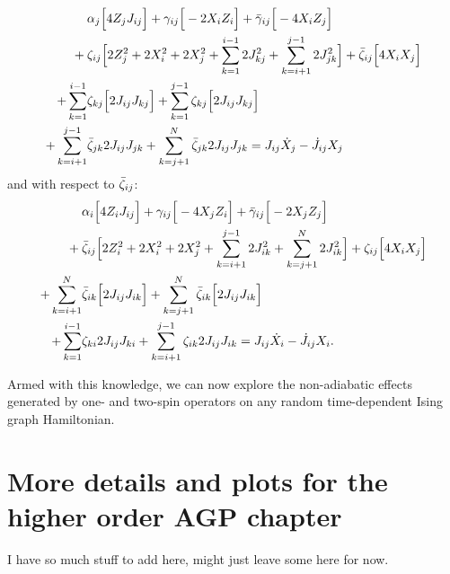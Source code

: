 \begin{equation}\label{eq:ising_graph_minimise_zeta}
    \begin{aligned}
        &\alpha_j\Big[ 4 Z_j J_{ij} \Big] + \gamma_{ij}\Big[ - 2 X_i Z_i\Big] + \Bar{\gamma}_{ij} \Big[ - 4 X_i Z_j \Big] \\
        + \: &\zeta_{ij} \Big[ 2 Z_j^2 + 2X_i^2 + 2X_j^2 + \sum_{k = 1}^{i-1} 2 J_{kj}^2 + \sum_{k = i+1}^{j-1} 2 J_{jk}^2 \Big] + \Bar{\zeta}_{ij}\Big[ 4 X_i X_j \Big] \\
        + \sum_{k = 1}^{i-1} &\zeta_{kj}\Big[ 2 J_{ij} J_{kj} \Big] + \sum_{k = 1}^{j-1} \zeta_{kj} \Big[2 J_{ij}J_{kj}\Big] \\
        + \sum_{k = i +1}^{j-1} &\Bar{\zeta}_{jk} 2 J_{ij} J_{jk} + \sum_{k = j +1}^N \Bar{\zeta}_{jk} 2 J_{ij} J_{jk} = J_{ij} \dot{X}_j - \dot{J}_{ij} X_j
    \end{aligned}
\end{equation}
and with respect to $\Bar{\zeta}_{ij}$:
\begin{equation}\label{eq:ising_graph_minimise_zetabar}
    \begin{aligned}
        &\alpha_i\Big[ 4 Z_i J_{ij} \Big] + \gamma_{ij}\Big[ - 4 X_j Z_i\Big] + \Bar{\gamma}_{ij} \Big[ - 2 X_j Z_j \Big] \\
        + \: &\Bar{\zeta}_{ij} \Big[ 2 Z_i^2 + 2X_i^2 + 2X_j^2 + \sum_{k = i+1}^{j-1} 2 J_{ik}^2 + \sum_{k = j+1}^N 2 J_{ik}^2 \Big] + \zeta_{ij}\Big[ 4 X_i X_j \Big] \\
        + \sum_{k = i+1}^N &\Bar{\zeta}_{ik}\Big[ 2 J_{ij} J_{ik} \Big] + \sum_{k = j+1}^N \Bar{\zeta}_{ik} \Big[2 J_{ij}J_{ik}\Big] \\
        + \sum_{k = 1}^{i-1} &\zeta_{ki} 2 J_{ij} J_{ki} + \sum_{k = i+1}^{j-1} \zeta_{ik} 2 J_{ij} J_{ik} = J_{ij} \dot{X}_i - \dot{J}_{ij} X_i.
    \end{aligned}
\end{equation}

Armed with this knowledge, we can now explore the non-adiabatic effects generated by one- and two-spin operators on any random time-dependent Ising graph Hamiltonian. 

\chapter{More details and plots for the higher order AGP chapter}\label{app:higher_order_AGP}

I have so much stuff to add here, might just leave some here for now. 

